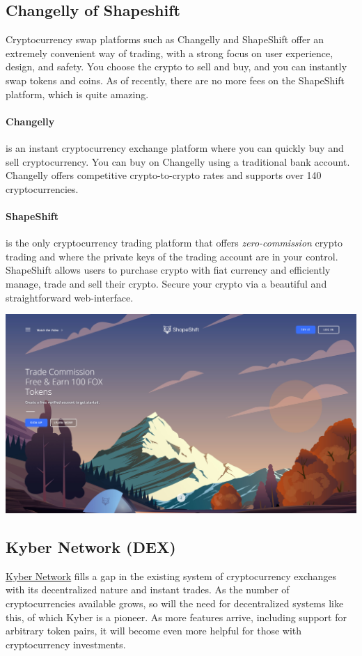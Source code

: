 \subsection*{Changelly of Shapeshift}
Cryptocurrency swap platforms such as Changelly and ShapeShift offer an extremely convenient way of trading, with a strong focus on user experience, design, and safety. You choose the crypto to sell and buy, and you can instantly swap tokens and coins. As of recently, there are no more fees on the ShapeShift platform, which is quite amazing.

\paragraph{Changelly} is an instant cryptocurrency exchange platform where you can quickly buy and sell cryptocurrency. You can buy on Changelly using a traditional bank account. Changelly offers competitive crypto-to-crypto rates and supports over 140 cryptocurrencies.

\paragraph{ShapeShift} is the only cryptocurrency trading platform that offers \emph{zero-commission} crypto trading and where the private keys of the trading account are in your control. ShapeShift allows users to purchase crypto with fiat currency and efficiently manage, trade and sell their crypto. Secure your crypto via a beautiful and straightforward web-interface. 

\medskip
\begin{borderbox}
    \includegraphics[width=\textwidth]{img/ch-exchanges/ShapeShift.jpg}
\end{borderbox}

\subsection*{Kyber Network (DEX)}
\href{https://www.kyber.network}{Kyber Network} fills a gap in the existing system of cryptocurrency exchanges with its decentralized nature and instant trades. As the number of cryptocurrencies available grows, so will the need for decentralized systems like this, of which Kyber is a pioneer. As more features arrive, including support for arbitrary token pairs, it will become even more helpful for those with cryptocurrency investments.

